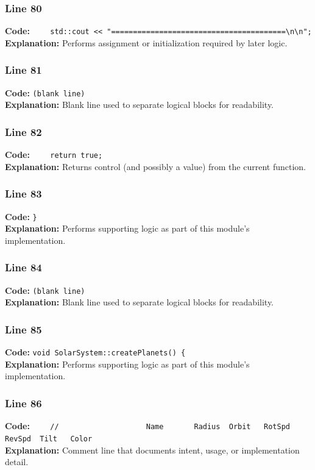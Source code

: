 \documentclass[11pt,a4paper]{article}
\begin{document}
\subsubsection*{Line 80}
\textbf{Code:} \verb|    std::cout << "========================================\n\n";|\\
\textbf{Explanation:} Performs assignment or initialization required by later logic.

\subsubsection*{Line 81}
\textbf{Code:} \texttt{(blank line)}\\
\textbf{Explanation:} Blank line used to separate logical blocks for readability.

\subsubsection*{Line 82}
\textbf{Code:} \verb|    return true;|\\
\textbf{Explanation:} Returns control (and possibly a value) from the current function.

\subsubsection*{Line 83}
\textbf{Code:} \verb|}|\\
\textbf{Explanation:} Performs supporting logic as part of this module's implementation.

\subsubsection*{Line 84}
\textbf{Code:} \texttt{(blank line)}\\
\textbf{Explanation:} Blank line used to separate logical blocks for readability.

\subsubsection*{Line 85}
\textbf{Code:} \verb|void SolarSystem::createPlanets() {|\\
\textbf{Explanation:} Performs supporting logic as part of this module's implementation.

\subsubsection*{Line 86}
\textbf{Code:} \verb|    //                    Name       Radius  Orbit   RotSpd  RevSpd  Tilt   Color|\\
\textbf{Explanation:} Comment line that documents intent, usage, or implementation detail.
\end{document}
